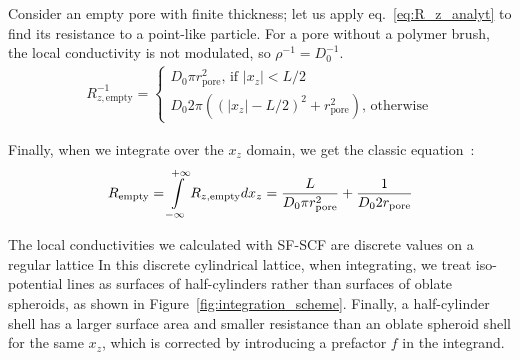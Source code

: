 \documentclass[10pt, a4paper]{article}
\begin{document}
\begin{multicols}{2}
Consider an empty pore with finite thickness; let us apply eq.~\ref{eq:R_z_analyt} to find its resistance to a point-like particle.
For a pore without a polymer brush, the local conductivity is not modulated, so $\rho^{-1} = D_0^{-1}$.
\begin{gather}
    \label{eq:r_z_empty}
    R_{z, \textrm{empty}}^{-1} = 
    \begin{cases}
        D_0 \pi r_{\textrm{pore}}^2 \textrm{, if } |x_z| < L/2
        \\
        D_0 2 \pi \left((|x_z|-L/2)^2 + r_{\textrm{pore}}^2\right) \textrm{, otherwise} 
    \end{cases}
\end{gather}

Finally, when we integrate over the $x_z$ domain, we get the classic equation~\cite{Brunn1984}:
\begin{equation}
    \label{eq:r_empty}
    R_{\textrm{empty}} = \int\displaylimits_{-\infty}^{+\infty} R_{z, \textrm{empty}} dx_z
    =\frac{L}{D_0 \pi r_{\textrm{pore}}^2} + \frac{1}{D_0 2 r_{\textrm{pore}}}
\end{equation}

The local conductivities we calculated with SF-SCF are discrete values on a regular lattice
In this discrete cylindrical lattice, when integrating, we treat iso-potential lines as surfaces of half-cylinders rather than surfaces of oblate spheroids, as shown in Figure~\ref{fig:integration_scheme}.
Finally, a half-cylinder shell has a larger surface area and smaller resistance than an oblate spheroid shell for the same $x_z$, which is corrected by introducing a prefactor $f$ in the integrand.


\end{multicols}
\end{document}
